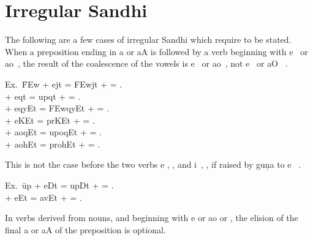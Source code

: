 \section{Irregular Sandhi}

\s The following are a few cases of irregular Sandhi which require to be
stated. When a preposition ending in {\dn a} or {\dn aA}  is
followed by a verb beginning with {\dn e}~ or {\dn ao}~, the result
of the coalescence of the vowels is {\dn e}~ or {\dn ao}~, not
{\dn e\?}~ or {\dn aO}~ .

\begin{tabbing}
  Ex.\ \={\dn \3FEw} + {\dn ejt\?} = {\dn \3FEw\?jt\?}  +  =
  .\\
   + {\dn eqt\?} = {\dn up\?qt\?}  +  =
  .\\
   + {\dn eqyEt} = {\dn \3FEw\?qyEt}  +  =
  .\footnotemark\\
   + {\dn eKEt} = {\dn pr\?KEt}  +  =
  .\\
   + {\dn aoqEt} = {\dn upoqEt}  +  =
  .\\
   + {\dn aohEt} = {\dn prohEt}  +  =
  .
\end{tabbing}


\begin{note}
  This is not the case before the two verbs {\dn e} , , and {\dn i}~, , if raised by guṇa to {\dn e}~
  .

  \begin{tabbing}
    Ex.\ \={\dn up} + {\dn eDt\?} = {\dn up\4Dt\?}  +  =
    .\\
     + {\dn eEt} = {\dn av\4Et}  +  = .
  \end{tabbing}

  In verbs derived from nouns, and beginning with {\dn e} or {\dn ao}  or
  , the elision of the final {\dn a} or {\dn aA}  of the
  preposition is optional.
\end{note}

